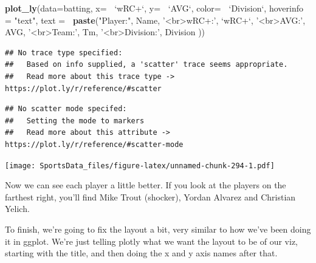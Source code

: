 \documentclass[
]{book}
\newenvironment{Shaded}{\begin{snugshade}}{\end{snugshade}}
\newcommand{\DataTypeTok}[1]{\textcolor[rgb]{0.13,0.29,0.53}{#1}}
\newcommand{\KeywordTok}[1]{\textcolor[rgb]{0.13,0.29,0.53}{\textbf{#1}}}
\newcommand{\NormalTok}[1]{#1}
\newcommand{\OperatorTok}[1]{\textcolor[rgb]{0.81,0.36,0.00}{\textbf{#1}}}
\newcommand{\StringTok}[1]{\textcolor[rgb]{0.31,0.60,0.02}{#1}}
\begin{document}
\begin{Shaded}
\begin{Highlighting}[]
\KeywordTok{plot_ly}\NormalTok{(}\DataTypeTok{data=}\NormalTok{batting, }\DataTypeTok{x=} \OperatorTok{~}\StringTok{`}\DataTypeTok{wRC+}\StringTok{`}\NormalTok{, }\DataTypeTok{y=} \OperatorTok{~}\StringTok{`}\DataTypeTok{AVG}\StringTok{`}\NormalTok{, }\DataTypeTok{color=} \OperatorTok{~}\StringTok{`}\DataTypeTok{Division}\StringTok{`}\NormalTok{,}
        \DataTypeTok{hoverinfo =} \StringTok{"text"}\NormalTok{,}
        \DataTypeTok{text =} \OperatorTok{~}\KeywordTok{paste}\NormalTok{(}\StringTok{"Player:"}\NormalTok{, Name,}
                      \StringTok{'<br>wRC+:'}\NormalTok{, }\StringTok{`}\DataTypeTok{wRC+}\StringTok{`}\NormalTok{,}
                      \StringTok{'<br>AVG:'}\NormalTok{, AVG,}
                      \StringTok{'<br>Team:'}\NormalTok{, Tm,}
                      \StringTok{'<br>Division:'}\NormalTok{, Division}
\NormalTok{                      ))}
\end{Highlighting}
\end{Shaded}

\begin{verbatim}
## No trace type specified:
##   Based on info supplied, a 'scatter' trace seems appropriate.
##   Read more about this trace type -> https://plot.ly/r/reference/#scatter
\end{verbatim}

\begin{verbatim}
## No scatter mode specifed:
##   Setting the mode to markers
##   Read more about this attribute -> https://plot.ly/r/reference/#scatter-mode
\end{verbatim}

\texttt{[image: SportsData\_files/figure-latex/unnamed-chunk-294-1.pdf]}

Now we can see each player a little better. If you look at the players on the farthest right, you'll find Mike Trout (shocker), Yordan Alvarez and Christian Yelich.

To finish, we're going to fix the layout a bit, very similar to how we've been doing it in ggplot. We're just telling plotly what we want the layout to be of our viz, starting with the title, and then doing the x and y axis names after that.
\end{document}
